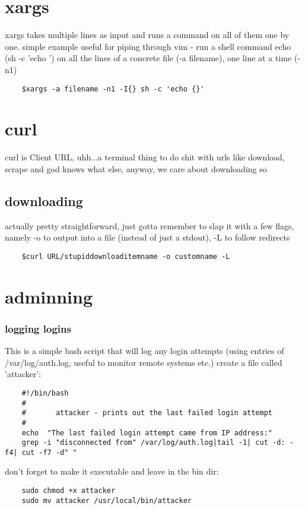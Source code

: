 \section{xargs}%
\label{sec:xargs}

xargs takes multiple lines as input and runs a command on all of them one by one. simple example useful for piping through vim - run a shell command echo (sh -c 'echo {}') on all the lines of a concrete file (-a filename), one line at a time (-n1)
\begin{verbatim}
	$xargs -a filename -n1 -I{} sh -c 'echo {}'
\end{verbatim}
\section{curl}%
\label{sec:curl}

curl is Client URL, uhh...a terminal thing to do shit with urls like download, scrape and god knows what else, anyway, we care about downloading so
\subsection{downloading}%
\label{sub:downloading}

actually pretty straightforward, just gotta remember to slap it with a few flags, namely -o to output into a file (instead of just a stdout), -L to follow redirects
\begin{verbatim}
	$curl URL/stupiddownloaditemname -o customname -L
\end{verbatim}
\section{adminning}%
\label{sec:adminning}

\subsubsection{logging logins}%
\label{ssub:logging_logins}

This is a simple bash script that will log any login attempts (using entries of /var/log/auth.log, useful to monitor remote systems etc.)
create a file called 'attacker':
\begin{verbatim}
	#!/bin/bash
	#
	#       attacker - prints out the last failed login attempt
	#
	echo  "The last failed login attempt came from IP address:"
	grep -i "disconnected from" /var/log/auth.log|tail -1| cut -d: -f4| cut -f7 -d" "
\end{verbatim}
don't forget to make it executable and leave in the bin dir:
\begin{verbatim}
	sudo chmod +x attacker
	sudo mv attacker /usr/local/bin/attacker
\end{verbatim}


